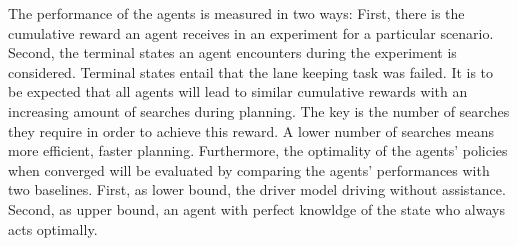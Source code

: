 
The performance of the agents is measured in two ways: First, there is the cumulative reward an agent receives in an experiment for a particular scenario. Second, the terminal states an agent encounters during the experiment is considered. Terminal states entail that the lane keeping task was failed. It is to be expected that all agents will lead to similar cumulative rewards with an increasing amount of searches during planning. The key is the number of searches they require in order to achieve this reward. A lower number of searches means more efficient, faster planning. Furthermore, the optimality of the agents' policies when converged will be evaluated by comparing the agents' performances with two baselines. First, as lower bound, the driver model driving without assistance. Second, as upper bound, an agent with perfect knowldge of the state who always acts optimally.

